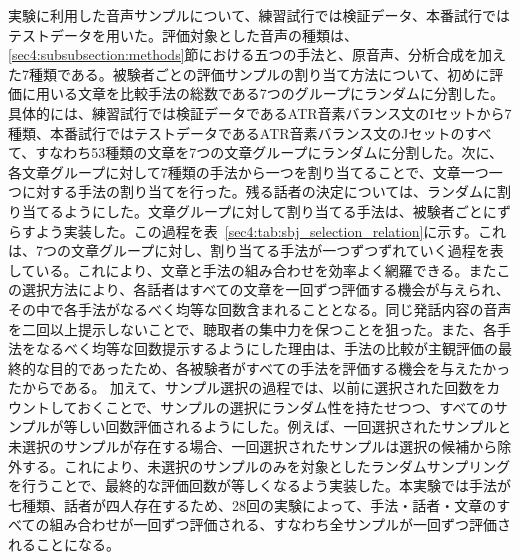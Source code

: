 \documentclass[12pt]{jarticle}
\numberwithin{equation}{section}    %
\numberwithin{figure}{section}      %
\numberwithin{table}{section}      %
\begin{document}
実験に利用した音声サンプルについて、練習試行では検証データ、本番試行ではテストデータを用いた。評価対象とした音声の種類は、\ref{sec4:subsubsection:methods}節における五つの手法と、原音声、分析合成を加えた7種類である。被験者ごとの評価サンプルの割り当て方法について、初めに評価に用いる文章を比較手法の総数である7つのグループにランダムに分割した。具体的には、練習試行では検証データであるATR音素バランス文のIセットから7種類、本番試行ではテストデータであるATR音素バランス文のJセットのすべて、すなわち53種類の文章を7つの文章グループにランダムに分割した。次に、各文章グループに対して7種類の手法から一つを割り当てることで、文章一つ一つに対する手法の割り当てを行った。残る話者の決定については、ランダムに割り当てるようにした。文章グループに対して割り当てる手法は、被験者ごとにずらすよう実装した。この過程を表~\ref{sec4:tab:sbj_selection_relation}に示す。これは、7つの文章グループに対し、割り当てる手法が一つずつずれていく過程を表している。これにより、文章と手法の組み合わせを効率よく網羅できる\cite{king2008blizzard}。またこの選択方法により、各話者はすべての文章を一回ずつ評価する機会が与えられ、その中で各手法がなるべく均等な回数含まれることとなる。同じ発話内容の音声を二回以上提示しないことで、聴取者の集中力を保つことを狙った。また、各手法をなるべく均等な回数提示するようにした理由は、手法の比較が主観評価の最終的な目的であったため、各被験者がすべての手法を評価する機会を与えたかったからである。
加えて、サンプル選択の過程では、以前に選択された回数をカウントしておくことで、サンプルの選択にランダム性を持たせつつ、すべてのサンプルが等しい回数評価されるようにした。例えば、一回選択されたサンプルと未選択のサンプルが存在する場合、一回選択されたサンプルは選択の候補から除外する。これにより、未選択のサンプルのみを対象としたランダムサンプリングを行うことで、最終的な評価回数が等しくなるよう実装した。本実験では手法が七種類、話者が四人存在するため、28回の実験によって、手法・話者・文章のすべての組み合わせが一回ずつ評価される、すなわち全サンプルが一回ずつ評価されることになる。
\end{document}
